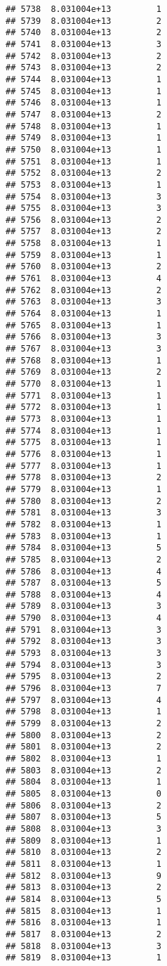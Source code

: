 \documentclass[
]{article}
\begin{document}
\begin{verbatim}
## 5738  8.031004e+13         1
## 5739  8.031004e+13         2
## 5740  8.031004e+13         2
## 5741  8.031004e+13         3
## 5742  8.031004e+13         2
## 5743  8.031004e+13         2
## 5744  8.031004e+13         1
## 5745  8.031004e+13         1
## 5746  8.031004e+13         1
## 5747  8.031004e+13         2
## 5748  8.031004e+13         1
## 5749  8.031004e+13         1
## 5750  8.031004e+13         1
## 5751  8.031004e+13         1
## 5752  8.031004e+13         2
## 5753  8.031004e+13         1
## 5754  8.031004e+13         3
## 5755  8.031004e+13         3
## 5756  8.031004e+13         2
## 5757  8.031004e+13         2
## 5758  8.031004e+13         1
## 5759  8.031004e+13         1
## 5760  8.031004e+13         2
## 5761  8.031004e+13         4
## 5762  8.031004e+13         2
## 5763  8.031004e+13         3
## 5764  8.031004e+13         1
## 5765  8.031004e+13         1
## 5766  8.031004e+13         3
## 5767  8.031004e+13         3
## 5768  8.031004e+13         1
## 5769  8.031004e+13         2
## 5770  8.031004e+13         1
## 5771  8.031004e+13         1
## 5772  8.031004e+13         1
## 5773  8.031004e+13         1
## 5774  8.031004e+13         1
## 5775  8.031004e+13         1
## 5776  8.031004e+13         1
## 5777  8.031004e+13         1
## 5778  8.031004e+13         2
## 5779  8.031004e+13         1
## 5780  8.031004e+13         2
## 5781  8.031004e+13         3
## 5782  8.031004e+13         1
## 5783  8.031004e+13         1
## 5784  8.031004e+13         5
## 5785  8.031004e+13         2
## 5786  8.031004e+13         4
## 5787  8.031004e+13         5
## 5788  8.031004e+13         4
## 5789  8.031004e+13         3
## 5790  8.031004e+13         4
## 5791  8.031004e+13         3
## 5792  8.031004e+13         3
## 5793  8.031004e+13         3
## 5794  8.031004e+13         3
## 5795  8.031004e+13         2
## 5796  8.031004e+13         7
## 5797  8.031004e+13         4
## 5798  8.031004e+13         1
## 5799  8.031004e+13         2
## 5800  8.031004e+13         2
## 5801  8.031004e+13         2
## 5802  8.031004e+13         1
## 5803  8.031004e+13         2
## 5804  8.031004e+13         1
## 5805  8.031004e+13         0
## 5806  8.031004e+13         2
## 5807  8.031004e+13         5
## 5808  8.031004e+13         3
## 5809  8.031004e+13         1
## 5810  8.031004e+13         2
## 5811  8.031004e+13         1
## 5812  8.031004e+13         9
## 5813  8.031004e+13         2
## 5814  8.031004e+13         5
## 5815  8.031004e+13         1
## 5816  8.031004e+13         1
## 5817  8.031004e+13         2
## 5818  8.031004e+13         3
## 5819  8.031004e+13         1

\end{verbatim}
\end{document}
